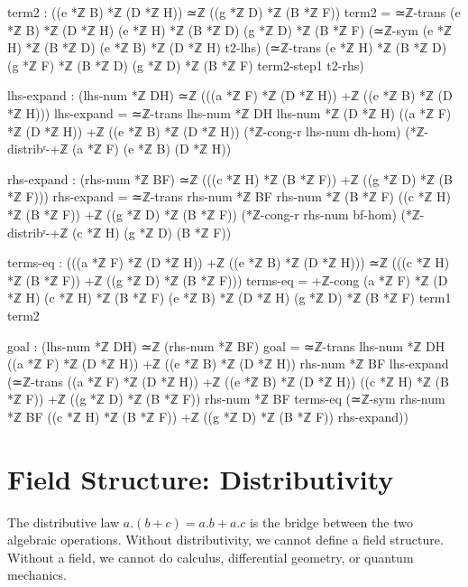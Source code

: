 \documentclass[11pt,a4paper]{book}
\def\cdot{.}%
\begin{document}
\begin{code}
    term2 : ((e *ℤ B) *ℤ (D *ℤ H)) ≃ℤ ((g *ℤ D) *ℤ (B *ℤ F))
    term2 = ≃ℤ-trans {(e *ℤ B) *ℤ (D *ℤ H)} {(e *ℤ H) *ℤ (B *ℤ D)} {(g *ℤ D) *ℤ (B *ℤ F)}
              (≃ℤ-sym {(e *ℤ H) *ℤ (B *ℤ D)} {(e *ℤ B) *ℤ (D *ℤ H)} t2-lhs)
              (≃ℤ-trans {(e *ℤ H) *ℤ (B *ℤ D)} {(g *ℤ F) *ℤ (B *ℤ D)} {(g *ℤ D) *ℤ (B *ℤ F)} term2-step1 t2-rhs)

    lhs-expand : (lhs-num *ℤ DH) ≃ℤ (((a *ℤ F) *ℤ (D *ℤ H)) +ℤ ((e *ℤ B) *ℤ (D *ℤ H)))
    lhs-expand = ≃ℤ-trans {lhs-num *ℤ DH} {lhs-num *ℤ (D *ℤ H)} 
                  {((a *ℤ F) *ℤ (D *ℤ H)) +ℤ ((e *ℤ B) *ℤ (D *ℤ H))}
                  (*ℤ-cong-r lhs-num dh-hom)
                  (*ℤ-distribʳ-+ℤ (a *ℤ F) (e *ℤ B) (D *ℤ H))

    rhs-expand : (rhs-num *ℤ BF) ≃ℤ (((c *ℤ H) *ℤ (B *ℤ F)) +ℤ ((g *ℤ D) *ℤ (B *ℤ F)))
    rhs-expand = ≃ℤ-trans {rhs-num *ℤ BF} {rhs-num *ℤ (B *ℤ F)}
                  {((c *ℤ H) *ℤ (B *ℤ F)) +ℤ ((g *ℤ D) *ℤ (B *ℤ F))}
                  (*ℤ-cong-r rhs-num bf-hom)
                  (*ℤ-distribʳ-+ℤ (c *ℤ H) (g *ℤ D) (B *ℤ F))

    terms-eq : (((a *ℤ F) *ℤ (D *ℤ H)) +ℤ ((e *ℤ B) *ℤ (D *ℤ H))) ≃ℤ 
               (((c *ℤ H) *ℤ (B *ℤ F)) +ℤ ((g *ℤ D) *ℤ (B *ℤ F)))
    terms-eq = +ℤ-cong {(a *ℤ F) *ℤ (D *ℤ H)} {(c *ℤ H) *ℤ (B *ℤ F)}
                       {(e *ℤ B) *ℤ (D *ℤ H)} {(g *ℤ D) *ℤ (B *ℤ F)}
                       term1 term2

    goal : (lhs-num *ℤ DH) ≃ℤ (rhs-num *ℤ BF)
    goal = ≃ℤ-trans {lhs-num *ℤ DH} 
             {((a *ℤ F) *ℤ (D *ℤ H)) +ℤ ((e *ℤ B) *ℤ (D *ℤ H))}
             {rhs-num *ℤ BF}
             lhs-expand
             (≃ℤ-trans {((a *ℤ F) *ℤ (D *ℤ H)) +ℤ ((e *ℤ B) *ℤ (D *ℤ H))}
                       {((c *ℤ H) *ℤ (B *ℤ F)) +ℤ ((g *ℤ D) *ℤ (B *ℤ F))}
                       {rhs-num *ℤ BF}
                       terms-eq
                       (≃ℤ-sym {rhs-num *ℤ BF} 
                               {((c *ℤ H) *ℤ (B *ℤ F)) +ℤ ((g *ℤ D) *ℤ (B *ℤ F))}
                               rhs-expand))
\end{code}

\chapter{Field Structure: Distributivity}
\label{chap:distributivity}

The distributive law $a \cdot (b + c) = a \cdot b + a \cdot c$ is the bridge between the two algebraic operations. Without distributivity, we cannot define a field structure. Without a field, we cannot do calculus, differential geometry, or quantum mechanics.
\end{document}
